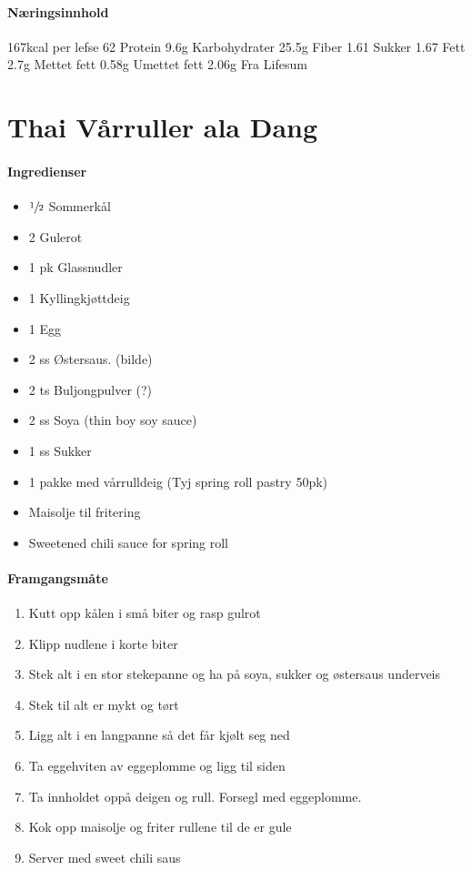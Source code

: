 \documentclass[12pt,a4paper]{book}
\begin{document}
\paragraph{Næringsinnhold}
167kcal per lefse
62
Protein 9.6g
Karbohydrater 25.5g
	Fiber 1.61
	Sukker 1.67
Fett 2.7g
	Mettet fett 0.58g
	Umettet fett 2.06g
Fra Lifesum
\clearpage{}
\clearpage{}\section{﻿Thai Vårruller ala Dang}


\paragraph{Ingredienser}
\begin{itemize}[noitemsep]
	\item  $\sfrac{1}{2}$  Sommerkål
	\item 2 Gulerot
	\item 1 pk Glassnudler
	\item 1 Kyllingkjøttdeig
	\item 1 Egg
	\item 2 ss Østersaus. (bilde)
	\item 2 ts Buljongpulver (?)
	\item 2 ss Soya (thin boy soy sauce)
	\item 1 ss Sukker
	\item 1 pakke med vårrulldeig (Tyj spring roll pastry 50pk)
	\item Maisolje til fritering
	\item Sweetened chili sauce for spring roll
\end{itemize}

\paragraph{Framgangsmåte}
\begin{enumerate}[noitemsep]
	\item Kutt opp kålen i små biter og rasp gulrot
	\item Klipp nudlene i korte biter
	\item Stek alt i en stor stekepanne og ha  på soya, sukker og østersaus underveis
	\item Stek til alt er mykt og tørt
	\item Ligg alt i en langpanne så det får kjølt seg ned
	\item Ta eggehviten av eggeplomme og ligg til siden
	\item Ta innholdet oppå deigen og rull.  Forsegl med eggeplomme.
	\item Kok opp maisolje og friter rullene til de er gule
	\item Server med sweet chili saus
\end{enumerate}
\end{document}

